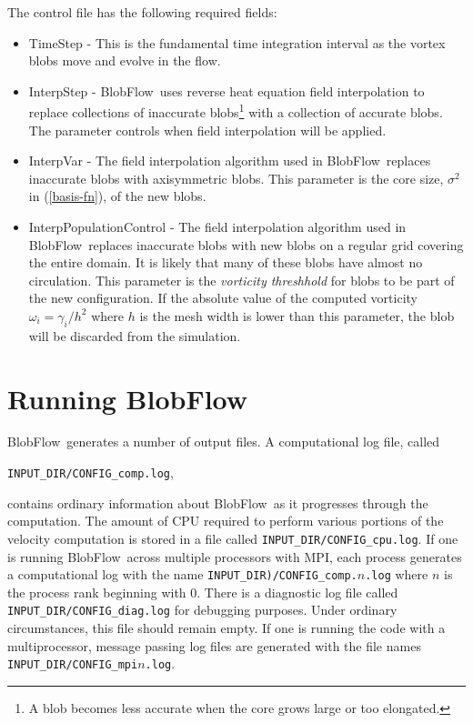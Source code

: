 \documentclass[12pt]{report}
\newcommand{\eqnn}[1]{(\ref{#1})}
\newcommand{\BF}{BlobFlow}
\begin{document}
The control file has the following required fields:
\begin{itemize}

\item TimeStep - This is the fundamental time integration interval as the
vortex blobs move and evolve in the flow.

\item InterpStep - \BF~uses reverse heat equation field interpolation to replace
collections of inaccurate blobs\footnote{A blob becomes less accurate when the
core grows large or too elongated.} with a collection of accurate
blobs\cite{barba-rossi}.  The parameter controls when field interpolation will
be applied.

\item InterpVar - The field interpolation algorithm used in \BF~replaces
inaccurate blobs with axisymmetric blobs.  This parameter is the core size,
$\sigma^2$ in \eqnn{basis-fn}, of the new blobs.

\item InterpPopulationControl - The field interpolation algorithm used in
\BF~replaces inaccurate blobs with new blobs on a regular grid covering the
entire domain.  It is likely that many of these blobs have almost no
circulation.  This parameter is the {\em vorticity threshhold} for blobs to be
part of the new configuration.  If the absolute value of the computed vorticity
$\omega_i=\gamma_i/h^2$ where $h$ is the mesh width is lower than this
parameter, the blob will be discarded from the simulation.

\end{itemize}

\section{Running \BF}

\BF~generates a number of output files.  A computational log file,
called
\begin{center}
{\tt INPUT\_DIR/CONFIG\_comp.log},
\end{center}
 contains ordinary information
about
\BF~as it progresses through the computation.  The amount of CPU required to
perform various portions of the velocity computation is stored in a file called
{\tt INPUT\_DIR/CONFIG\_cpu.log}. If one is running
\BF~across multiple processors with MPI, each process generates a computational
log with
the name {\tt INPUT\_DIR)/CONFIG\_comp.$n$.log} where $n$ is the process rank
beginning with 0.  There is a diagnostic log file called {\tt
INPUT\_DIR/CONFIG\_diag.log} for debugging purposes.  Under ordinary
circumstances, this file should remain empty.  If one is running the
code with a multiprocessor, message passing log files are generated with the
file names {\tt INPUT\_DIR/CONFIG\_mpi$n$.log}.
\end{document}
